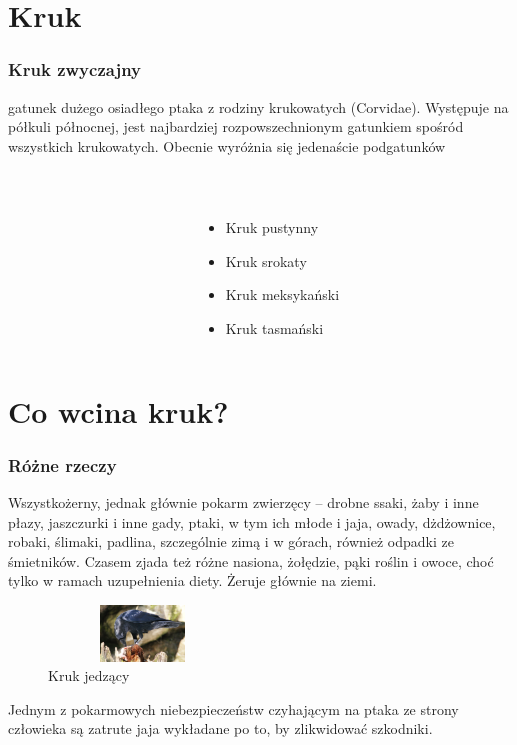 \documentclass{beamer}
\begin{document}
\section{Kruk}
	\begin{frame}
		\frametitle{Kruk zwyczajny}
			 gatunek dużego osiadłego ptaka z rodziny krukowatych (Corvidae). Występuje na półkuli północnej, jest najbardziej rozpowszechnionym gatunkiem spośród wszystkich krukowatych. Obecnie wyróżnia się jedenaście podgatunków
\footnotemark
		\begin{columns}[t]
			\begin{column}{.5\textwidth}
				\label{fig: kruk}
			\end{column}
			\begin{column}{.5\textwidth}
				\\\begin{itemize}
					\item Kruk pustynny
					\item Kruk srokaty
					\item Kruk meksykański
					\item Kruk tasmański
				\end{itemize}
			\end{column}
		\end{columns}
	\end{frame}

\section{Co wcina kruk?}
	\begin{frame}
		\frametitle{Różne rzeczy}
		Wszystkożerny, jednak głównie pokarm zwierzęcy – drobne ssaki, żaby i inne płazy, jaszczurki i inne gady, ptaki, w tym ich młode i jaja, owady, dżdżownice, robaki, ślimaki, padlina, szczególnie zimą i w górach, również odpadki ze śmietników. Czasem zjada też różne nasiona, żołędzie, pąki roślin i owoce, choć tylko w ramach uzupełnienia diety.
Żeruje głównie na ziemi. 
		\begin{figure}[H]
			\centering
			\includegraphics[width=5cm, height=1.5cm]{kruk_je.jpg}
			\caption{Kruk jedzący}
			\label{fig: wcina}
		\end{figure}
		Jednym z pokarmowych niebezpieczeństw czyhającym na ptaka ze strony człowieka są zatrute jaja wykładane po to, by zlikwidować szkodniki.
	\end{frame}
\end{document}
